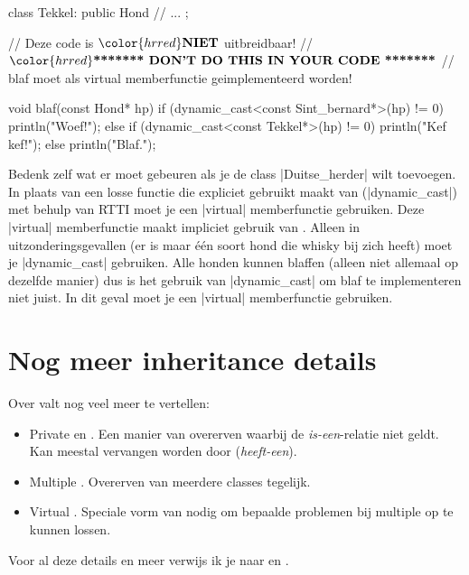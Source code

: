 \begin{cpplstShortInline}
\begin{cpplstfragment}[mathescape=true]
class Tekkel: public Hond {
//  ...
};

//  Deze code is $\color{hrred}\textbf{NIET}$ uitbreidbaar!
//  $\color{hrred}\textbf{******* DON'T DO THIS IN YOUR CODE *******}$
//  blaf moet als virtual memberfunctie geimplementeerd worden!

void blaf(const Hond* hp) {
    if (dynamic_cast<const Sint_bernard*>(hp) != 0)
        println("Woef!");
    else if (dynamic_cast<const Tekkel*>(hp) != 0)
        println("Kef kef!");
    else
        println("Blaf.");
}
\end{cpplstfragment}

Bedenk zelf wat er moet gebeuren als je de class |Duitse_herder| wilt toevoegen. 
In plaats van een losse functie die expliciet gebruikt maakt van  (|dynamic_cast|) met behulp van RTTI moet je een |virtual| memberfunctie gebruiken. 
Deze |virtual| memberfunctie maakt impliciet gebruik van . Alleen in uitzonderingsgevallen (er is maar één soort hond die whisky bij zich heeft) moet je |dynamic_cast| gebruiken. 
Alle honden kunnen blaffen (alleen niet allemaal op dezelfde manier) dus is het gebruik van |dynamic_cast| om blaf te implementeren niet juist. 
In dit geval moet je een |virtual| memberfunctie gebruiken.

\section{Nog meer inheritance details}
Over  valt nog veel meer te vertellen:
\begin{itemize}
    \item Private en .
    Een manier van overerven waarbij de \emph{is-een}-relatie niet geldt.
    Kan meestal vervangen worden door  (\emph{heeft-een}).
    \item Multiple .
    Overerven van meerdere classes tegelijk.
    \item Virtual .
    Speciale vorm van  nodig om bepaalde problemen bij multiple  op te kunnen lossen.
\end{itemize}
Voor al deze details en meer verwijs ik je naar \cite[hoofdstuk \href{http://www.icce.rug.nl/documents/cplusplus/cplusplus13.html}{13} tot en met \href{http://www.icce.rug.nl/documents/cplusplus/cplusplus17.html}{17}]{Brokken2019} en \cite[hoofdstuk 20 en 21]{Stroustrup2013}.


\end{cpplstShortInline}
